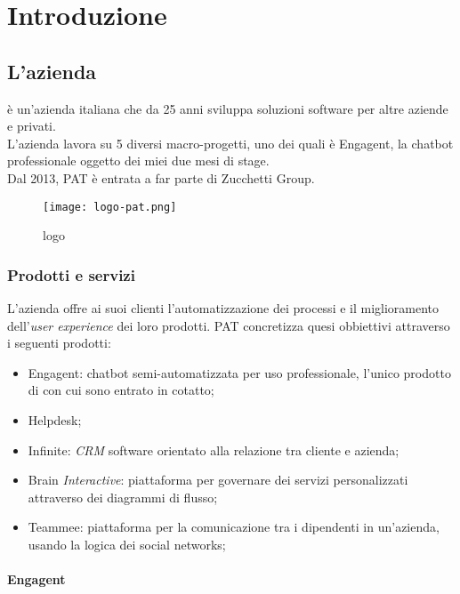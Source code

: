 
\chapter{Introduzione}
\label{cap:introduzione}
\section{L'azienda}

\company è un'azienda italiana che da 25 anni sviluppa soluzioni software per altre aziende e privati.\\
L'azienda lavora su 5 diversi macro-progetti, uno dei quali è Engagent, la chatbot professionale oggetto dei miei due mesi di stage.\\
Dal 2013, PAT è entrata a far parte di Zucchetti Group.
\begin{figure}[H]
    \centering
    \texttt{[image: logo-pat.png]} 
    \caption{logo \company}
    \label{logo:company}
\end{figure}

\subsection{Prodotti e servizi}
L'azienda offre ai suoi clienti l'automatizzazione dei processi e il miglioramento dell'\textit{user experience} dei loro prodotti.
PAT concretizza quesi obbiettivi attraverso i seguenti prodotti:
\begin{itemize}
    \item Engagent: chatbot semi-automatizzata per uso professionale, l'unico prodotto di \company con cui sono entrato in cotatto; 
    \item Helpdesk;
    \item Infinite: \textit{CRM} software orientato alla relazione tra cliente e azienda;
    \item Brain \textit{Interactive}: piattaforma per governare dei servizi personalizzati attraverso dei diagrammi di flusso; 
    \item Teammee: piattaforma per la comunicazione tra i dipendenti in un'azienda, usando la logica dei social networks;
\end{itemize}

\subsubsection{Engagent}

